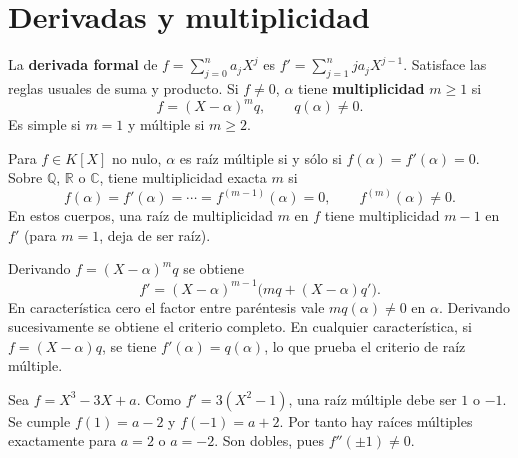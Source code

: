 \section{Derivadas y multiplicidad}
\begin{definicion}
La \textbf{derivada formal} de $f=\sum_{j=0}^n a_jX^j$ es
$f'=\sum_{j=1}^n ja_jX^{j-1}$. Satisface las reglas usuales de suma
y producto. Si $f\neq0$, $\alpha$ tiene \textbf{multiplicidad} $m\geq1$ si
\[
f=(X-\alpha)^m q,\qquad q(\alpha)\neq0.
\]
Es simple si $m=1$ y múltiple si $m\geq2$.
\end{definicion}
\begin{proposicion}[{title={Criterios de multiplicidad}}]
Para $f\in K[X]$ no nulo, $\alpha$ es raíz múltiple si y sólo si
$f(\alpha)=f'(\alpha)=0$.
Sobre $\mathbb Q$, $\mathbb R$ o $\mathbb C$, tiene multiplicidad exacta $m$ si
\[
f(\alpha)=f'(\alpha)=\cdots=f^{(m-1)}(\alpha)=0,
\qquad f^{(m)}(\alpha)\neq0.
\]
En estos cuerpos, una raíz de multiplicidad $m$ en $f$ tiene multiplicidad
$m-1$ en $f'$ (para $m=1$, deja de ser raíz).
\end{proposicion}
\begin{demostracion}
Derivando $f=(X-\alpha)^m q$ se obtiene
\[
f'=(X-\alpha)^{m-1}\bigl(mq+(X-\alpha)q'\bigr).
\]
En característica cero el factor entre paréntesis vale $mq(\alpha)\neq0$
en $\alpha$. Derivando sucesivamente se obtiene el criterio completo.
En cualquier característica, si $f=(X-\alpha)q$, se tiene
$f'(\alpha)=q(\alpha)$, lo que prueba el criterio de raíz múltiple.
\end{demostracion}
\begin{ejemplo}
Sea $f=X^3-3X+a$. Como $f'=3(X^2-1)$, una raíz múltiple debe ser
$1$ o $-1$. Se cumple $f(1)=a-2$ y $f(-1)=a+2$.
Por tanto hay raíces múltiples exactamente para $a=2$ o $a=-2$.
Son dobles, pues $f''(\pm1)\neq0$.
\end{ejemplo}

